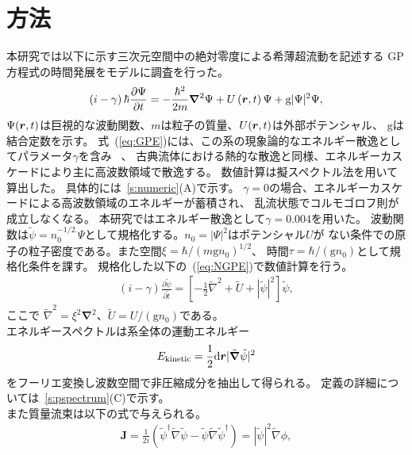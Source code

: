 \documentclass[12pt,a4paper]{jbook}
\def\Vec#1{\mbox{\boldmath $#1$}}			%
\begin{document}
		\section{方法}
		\label{s:formulation}
		本研究では以下に示す三次元空間中の絶対零度による希薄超流動を記述する
		GP方程式の時間発展をモデルに調査を行った。
		\begin{eqnarray}
			\label{eq:GPE}
			\left( i - \gamma \right)
			\hbar \frac{\partial \Psi}{\partial t}
			=
			- \frac{\hbar^2}{2m} \Vec{\nabla}^2 \Psi
			+ U \left(\Vec{r}, t\right) \Psi + \mathrm{g} |\Psi|^2 \Psi,
		\end{eqnarray}
		$\Psi(\Vec{r},t)$は巨視的な波動関数、$m$は粒子の質量、$U(\Vec{r},t)$は外部ポテンシャル、
		$\mathrm{g}$は結合定数を示す。
		式~(\ref{eq:GPE})には、この系の現象論的なエネルギー散逸としてパラメータ$\gamma$を含み
		~\cite{Kobayashi1,Kobayashi2,Kobayashi3}、
		古典流体における熱的な散逸と同様、エネルギーカスケードにより主に高波数領域で散逸する。
        数値計算は擬スペクトル法を用いて算出した。
        具体的には~\ref{s:numeric}(A)で示す。
		$\gamma = 0$の場合、エネルギーカスケードによる高波数領域のエネルギーが蓄積され、
		乱流状態でコルモゴロフ則が成立しなくなる。
		本研究ではエネルギー散逸として$\gamma=0.004$を用いた。
		波動関数は$\tilde{\psi}=n_0^{-1/2.}\Psi$として規格化する。$n_0=|\Psi|^2$はポテンシャル$U$が
		ない条件での原子の粒子密度である。また空間$\xi = \hbar/(m \mathrm{g} n_0)^{1/2}$、
		時間$\tau = \hbar/(\mathrm{g} n_0)$として規格化条件を課す。
		規格化した以下の~(\ref{eq:NGPE})で数値計算を行う。
		\begin{eqnarray}
			\label{eq:NGPE}
			(i-\gamma) \frac{\partial \tilde{\psi}}{\partial \tilde{t}}
			= \left[
				- \frac{1}{2} \tilde{\nabla}^2
				+ \tilde{U}
				+ |\tilde{\psi} |^2
			\right] \tilde{\psi},
		\end{eqnarray}
		ここで $\tilde{\nabla}^2 = \xi^2 \bm{\nabla}^2$、$\tilde{U} = U/({\mathrm g}n_0)$である。
        \\
        エネルギースペクトルは系全体の運動エネルギー
        \begin{eqnarray}
            E_{\rm{kinetic}} = \frac{1}{2} \rm{d} \Vec{r} |\tilde{\Vec{\nabla}}\tilde{\psi}|^2
        \end{eqnarray}
        をフーリエ変換し波数空間で非圧縮成分を抽出して得られる。
        定義の詳細については~\ref{s:pspectrum}(C)で示す。
        \\
		また質量流束は以下の式で与えられる。
		\begin{eqnarray}
			\label{eq:CURRENT}
			{\bm J} = \frac{1}{2 i}
			\left(
				\tilde{\psi}^\dagger \tilde{\nabla} \tilde{\psi} - \tilde{\psi} \tilde{\nabla} \tilde{\psi}^\dagger
			\right) = |\tilde{\psi}|^2 \tilde{\nabla} \phi,
		\end{eqnarray}
\end{document}
